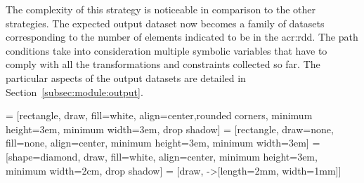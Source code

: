 The complexity of this strategy is noticeable in comparison to the other strategies. The expected output dataset now becomes a family of datasets corresponding to the number of elements indicated to be in the \acrshort{acr:rdd}. The path conditions take into consideration multiple symbolic variables that have to comply with all the transformations and constraints collected so far. The particular aspects of the output datasets are detailed in Section~\ref{subsec:module:output}.

 = [rectangle, draw, fill=white, align=center,rounded corners, minimum height=3em, minimum width=3em, drop shadow]
 = [rectangle, draw=none, fill=none, align=center, minimum height=3em, minimum width=3em]
 = [shape=diamond, draw, fill=white, align=center, minimum height=3em, minimum width=2cm, drop shadow]
 = [draw, -{>[length=2mm, width=1mm]}]

